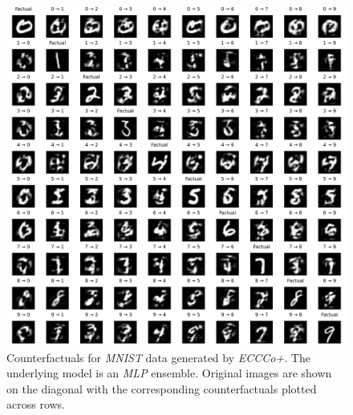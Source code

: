 \begin{figure}
  \centering
  \includegraphics[width=1.0\linewidth]{../www/mnist_all_mlp_ens_eccco.png}
  \caption{Counterfactuals for \textit{MNIST} data generated by \textit{ECCCo+}. The underlying model is an \textit{MLP} ensemble. Original images are shown on the diagonal with the corresponding counterfactuals plotted across rows.}\label{fig:mnist-eccco-mlp-ens}
\end{figure}

